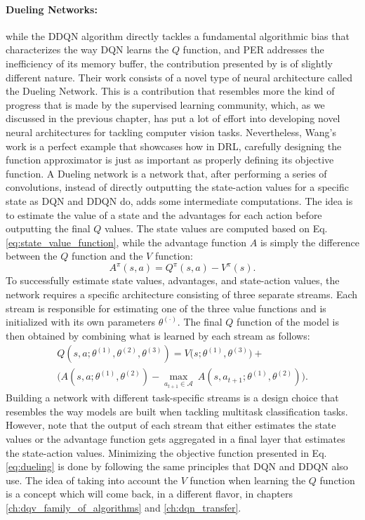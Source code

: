 \paragraph{Dueling Networks:} while the DDQN algorithm directly tackles a fundamental algorithmic bias that characterizes the way DQN learns the $Q$ function, and PER addresses the inefficiency of its memory buffer, the contribution presented by \citet{wang2016dueling} is of slightly different nature. Their work consists of a novel type of neural architecture called the Dueling Network. This is a contribution that resembles more the kind of progress that is made by the supervised learning community, which, as we discussed in the previous chapter, has put a lot of effort into developing novel neural architectures for tackling computer vision tasks. Nevertheless, Wang's work is a perfect example that showcases how in DRL, carefully designing the function approximator is just as important as properly defining its objective function. A Dueling network is a network that, after performing a series of convolutions, instead of directly outputting the state-action values for a specific state as DQN and DDQN do, adds some intermediate computations. The idea is to estimate the value of a state and the advantages for each action before outputting the final $Q$ values. The state values are computed based on Eq. \ref{eq:state_value_function}, while the advantage function $A$ is simply the difference between the $Q$ function and the $V$ function:
\begin{equation}
	A^{\pi}(s,a) = Q^{\pi}(s,a) - V^{\pi}(s).
\end{equation}
To successfully estimate state values, advantages, and state-action values, the network requires a specific architecture consisting of three separate streams. Each stream is responsible for estimating one of the three value functions and is initialized with its own parameters $\theta^{(\cdot)}$. The final $Q$ function of the model is then obtained by combining what is learned by each stream as follows:
\begin{multline}
	Q(s,a;\theta^{(1)},\theta^{(2)},\theta^{(3)}) = V\bigl(s;\theta^{(1)},\theta^{(3)}\bigr) + \\
	\bigl(A(s,a;\theta^{(1)},\theta^{(2)}) - \underset{a_{t+1}\in \mathcal{A}}{\max}\: A(s, a_{t+1};\theta^{(1)},\theta^{(2)}) \bigr).
	\label{eq:dueling}
\end{multline}
Building a network with different task-specific streams is a design choice that resembles the way models are built when tackling multitask classification tasks. However, note that the output of each stream that either estimates the state values or the advantage function gets aggregated in a final layer that estimates the state-action values. Minimizing the objective function presented in Eq. \ref{eq:dueling} is done by following the same principles that DQN and DDQN also use. The idea of taking into account the $V$ function when learning the $Q$ function is a concept which will come back, in a different flavor, in chapters \ref{ch:dqv_family_of_algorithms} and \ref{ch:dqn_transfer}.

